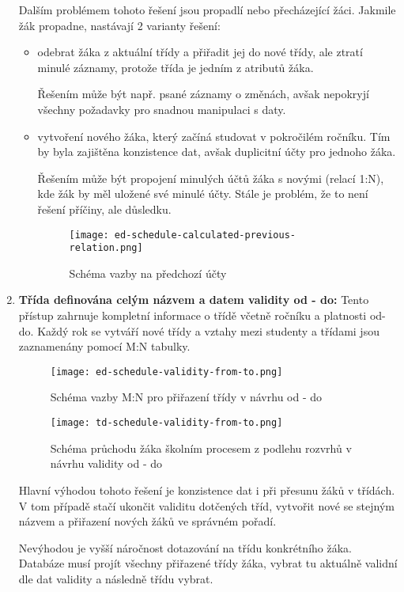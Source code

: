 \begin{enumerate}
    Dalším problémem tohoto řešení jsou propadlí nebo přecházející žáci. Jakmile žák propadne, nastávají 2 varianty řešení:
    \begin{itemize}
        \item odebrat žáka z aktuální třídy a přiřadit jej do nové třídy, ale ztratí minulé záznamy, protože třída je jedním z atributů žáka.

        Řešením může být např. psané záznamy o změnách, avšak nepokryjí všechny požadavky pro snadnou manipulaci s daty.
        \item vytvoření nového žáka, který začíná studovat v pokročilém ročníku. Tím by byla zajištěna konzistence dat, avšak duplicitní účty pro jednoho žáka.

        Řešením může být propojení minulých účtů žáka s novými (relací 1:N), kde žák by měl uložené své minulé účty. Stále je problém, že to není řešení příčiny, ale důsledku.
        \begin{figure}[H]
            \centering
            \texttt{[image: ed-schedule-calculated-previous-relation.png]}
            \caption{Schéma vazby na předchozí účty}
            \label{fig:ed-schedule-calculated-previous-relation}
        \end{figure}
    \end{itemize}

    \item \textbf{Třída definována celým názvem a datem validity od - do:} Tento přístup zahrnuje kompletní informace o třídě včetně ročníku a platnosti od-do. Každý rok se vytváří nové třídy a vztahy mezi studenty a třídami jsou zaznamenány pomocí M:N tabulky.

    \begin{figure}[H]
        \centering
        \texttt{[image: ed-schedule-validity-from-to.png]}
        \caption{Schéma vazby M:N pro přiřazení třídy v návrhu od - do}
        \label{fig:ed-schedule-validity-from-to}
    \end{figure}

    \begin{figure}[H]
        \centering
        \texttt{[image: td-schedule-validity-from-to.png]}
        \caption{Schéma průchodu žáka školním procesem z podlehu rozvrhů v návrhu validity od - do}
        \label{fig:td-schedule-validity-from-to}
    \end{figure}
    
    Hlavní výhodou tohoto řešení je konzistence dat i při přesunu žáků v třídách. V tom případě stačí ukončit validitu dotčených tříd, vytvořit nové se stejným názvem a přiřazení nových žáků ve správném pořadí.

    Nevýhodou je vyšší náročnost dotazování na třídu konkrétního žáka. Databáze musí projít všechny přiřazené třídy žáka, vybrat tu aktuálně validní dle dat validity a následně třídu vybrat.

\end{enumerate}

